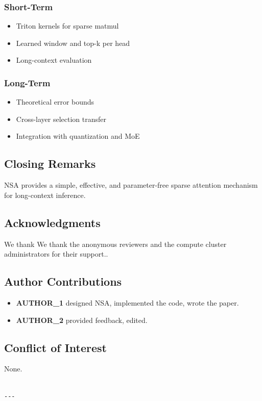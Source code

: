 \subsubsection{Short-Term}
\begin{itemize}
\item Triton kernels for sparse matmul
\item Learned window and top-k per head
\item Long-context evaluation

\end{itemize}
\subsubsection{Long-Term}
\begin{itemize}
\item Theoretical error bounds
\item Cross-layer selection transfer
\item Integration with quantization and MoE

\end{itemize}
\subsection{Closing Remarks}

NSA provides a simple, effective, and parameter-free sparse attention 
mechanism for long-context inference.

\subsection{Acknowledgments}

We thank We thank the anonymous reviewers and the compute cluster administrators for their support..

\subsection{Author Contributions}

\begin{itemize}
\item \textbf{{{AUTHOR\_1}}} designed NSA, implemented the code, wrote the paper.
\item \textbf{{{AUTHOR\_2}}} provided feedback, edited.

\end{itemize}
\subsection{Conflict of Interest}

None.
\begin{lstlisting}

---
\end{lstlisting}